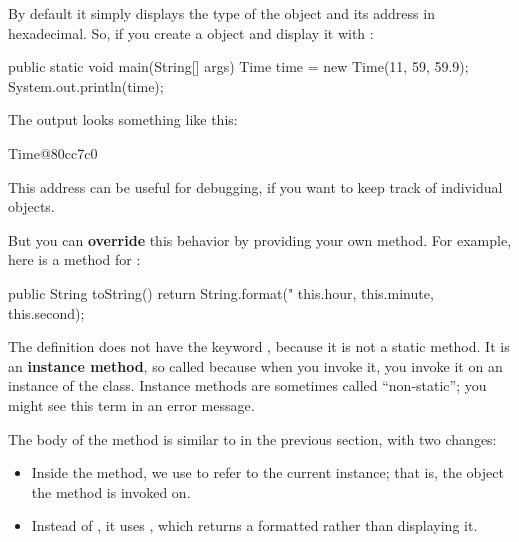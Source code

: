 
By default it simply displays the type of the object and its address in hexadecimal.
So, if you create a  object and display it with :

\begin{code}
public static void main(String[] args) {
    Time time = new Time(11, 59, 59.9);
    System.out.println(time);
}
\end{code}


The output looks something like this:

\begin{stdout}
Time@80cc7c0
\end{stdout}


This address can be useful for debugging, if you want to keep track of individual objects.


But you can {\bf override} this behavior by providing your own  method.
For example, here is a  method for :

\begin{code}
public String toString() {
    return String.format("%
        this.hour, this.minute, this.second);
}
\end{code}


The definition does not have the keyword , because it is not a static method.
It is an {\bf instance method}, so called because when you invoke it, you invoke it on an instance of the class.
Instance methods are sometimes called ``non-static''; you might see this term in an error message.

The body of the method is similar to  in the previous section, with two changes:

\begin{itemize}

\item Inside the method, we use  to refer to the current instance; that is, the object the method is invoked on.

\item Instead of , it uses , which returns a formatted  rather than displaying it.

\end{itemize}

